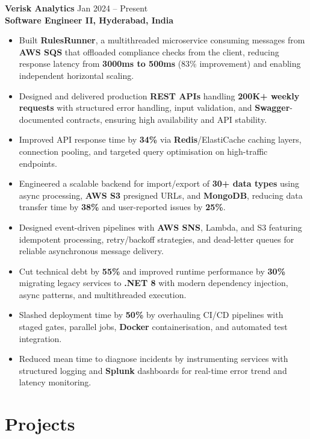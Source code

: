 \documentclass[a4paper,10pt]{article}
\begin{document}
\textbf{Verisk Analytics} \hfill Jan 2024 -- Present \\
\textbf{Software Engineer II, Hyderabad, India}
\begin{itemize}[leftmargin=*]
    \item Built \textbf{RulesRunner}, a multithreaded microservice consuming messages from \textbf{AWS SQS} that offloaded compliance checks from the client, reducing response latency from \textbf{3000ms to 500ms} (83\% improvement) and enabling independent horizontal scaling.
    \item Designed and delivered production \textbf{REST APIs} handling \textbf{200K+ weekly requests} with structured error handling, input validation, and \textbf{Swagger}-documented contracts, ensuring high availability and API stability.
    \item Improved API response time by \textbf{34\%} via \textbf{Redis}/ElastiCache caching layers, connection pooling, and targeted query optimisation on high-traffic endpoints.
    \item Engineered a scalable backend for import/export of \textbf{30+ data types} using async processing, \textbf{AWS S3} presigned URLs, and \textbf{MongoDB}, reducing data transfer time by \textbf{38\%} and user-reported issues by \textbf{25\%}.
    \item Designed event-driven pipelines with \textbf{AWS SNS}, Lambda, and S3 featuring idempotent processing, retry/backoff strategies, and dead-letter queues for reliable asynchronous message delivery.
    \item Cut technical debt by \textbf{55\%} and improved runtime performance by \textbf{30\%} migrating legacy services to \textbf{.NET 8} with modern dependency injection, async patterns, and multithreaded execution.
    \item Slashed deployment time by \textbf{50\%} by overhauling CI/CD pipelines with staged gates, parallel jobs, \textbf{Docker} containerisation, and automated test integration.
    \item Reduced mean time to diagnose incidents by instrumenting services with structured logging and \textbf{Splunk} dashboards for real-time error trend and latency monitoring.
\end{itemize}

\section*{Projects}
\end{document}
